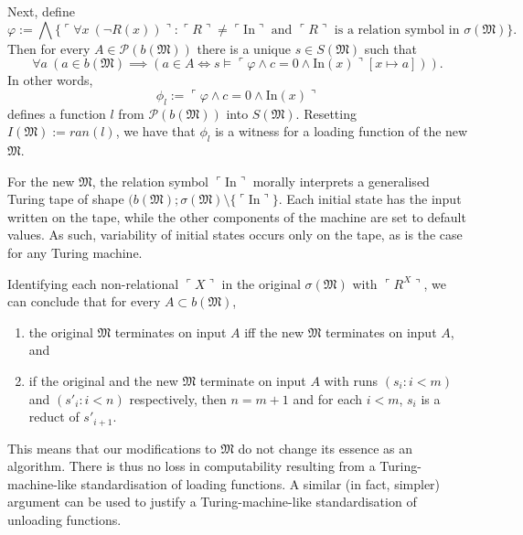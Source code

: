 \documentclass[12pt, twoside]{memoir}
\numberwithin{equation}{section}
\theoremstyle{definition}
\theoremstyle{remark}
\theoremstyle{definition}
\theoremstyle{definition}
\theoremstyle{definition}
\theoremstyle{remark}
\begin{document}
Next, define 
\begin{equation*}
    \varphi := \bigwedge \{\ulcorner \forall x \ (\neg R(x)) \urcorner : \ulcorner R \urcorner \neq \ulcorner \mathrm{In} \urcorner \text{ and } \ulcorner R \urcorner \text{ is a relation symbol in } \sigma(\mathfrak{M})\} \text{.}
\end{equation*}
Then for every $A \in \mathcal{P}(b(\mathfrak{M}))$ there is a unique $s \in S(\mathfrak{M})$ such that 
\begin{equation*}
    \forall a \ (a \in b(\mathfrak{M}) \implies (a \in A \iff s \models \ulcorner \varphi \wedge c = 0 \wedge \mathrm{In}(x) \urcorner [x \mapsto a])) \text{.}
\end{equation*}
In other words, 
\begin{equation*}
    \phi_l := \ulcorner \varphi \wedge c = 0 \wedge \mathrm{In}(x) \urcorner
\end{equation*}
defines a function $l$ from $\mathcal{P}(b(\mathfrak{M}))$ into $S(\mathfrak{M})$. Resetting $I(\mathfrak{M}) := ran(l)$, we have that $\phi_l$ is a witness for a loading function of the new $\mathfrak{M}$. 

For the new $\mathfrak{M}$, the relation symbol $\ulcorner \mathrm{In} \urcorner$ morally interprets a generalised Turing tape of shape $(b(\mathfrak{M}); \sigma(\mathfrak{M}) \setminus \{\ulcorner \mathrm{In} \urcorner\}$. Each initial state has the input written on the tape, while the other components of the machine are set to default values. As such, variability of initial states occurs only on the tape, as is the case for any Turing machine. 

Identifying each non-relational $\ulcorner X \urcorner$ in the original $\sigma(\mathfrak{M})$ with $\ulcorner R^X \urcorner$, we can conclude that for every $A \subset b(\mathfrak{M})$, 
\begin{enumerate}[label=(\arabic*)]
    \item the original $\mathfrak{M}$ terminates on input $A$ iff the new $\mathfrak{M}$ terminates on input $A$, and
    \item if the original and the new $\mathfrak{M}$ terminate on input $A$ with runs $(s_i : i < m)$ and $(s'_i : i < n)$ respectively, then $n = m + 1$ and for each $i < m$, $s_i$ is a reduct of $s'_{i+1}$.
\end{enumerate} 
This means that our modifications to $\mathfrak{M}$ do not change its essence as an algorithm. There is thus no loss in computability resulting from a Turing-machine-like standardisation of loading functions. A similar (in fact, simpler) argument can be used to justify a Turing-machine-like standardisation of unloading functions.
\end{document}
